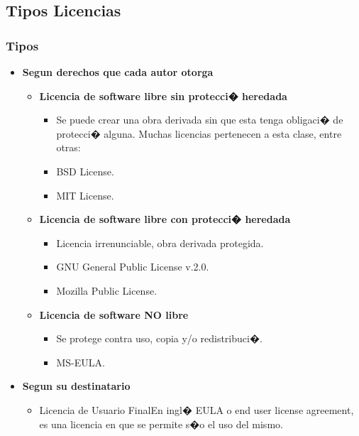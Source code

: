 \subsection{Tipos Licencias}
\frame
{
	\frametitle{Tipos}
	\begin{itemize}
	\item \textbf{Segun derechos que cada autor otorga}
		\begin{itemize}
		\item \textbf{Licencia de software libre sin protecci� heredada}
			\begin{itemize}
			\item Se puede crear una obra derivada sin que esta tenga obligaci� de protecci� alguna. Muchas licencias pertenecen a esta clase, entre otras:
			\item BSD License.
			\item MIT License.
			\end{itemize}
		
		\item \textbf{Licencia de software libre con protecci� heredada}
			\begin{itemize}
			\item Licencia irrenunciable, obra derivada protegida.
			\item GNU General Public License v.2.0.
			\item Mozilla Public License.
			\end{itemize}
		\item \textbf{Licencia de software NO libre}
			\begin{itemize}
			\item Se protege contra uso, copia y/o redistribuci�.
			\item MS-EULA.
			\end{itemize}
			
		\end{itemize}

		
	\item \textbf{Segun su destinatario}
		\begin{itemize}
		\item Licencia de Usuario FinalEn ingl� EULA o end user license agreement, es una licencia en que se permite s�o el uso del mismo.
		\end{itemize}
	\end{itemize}
}
